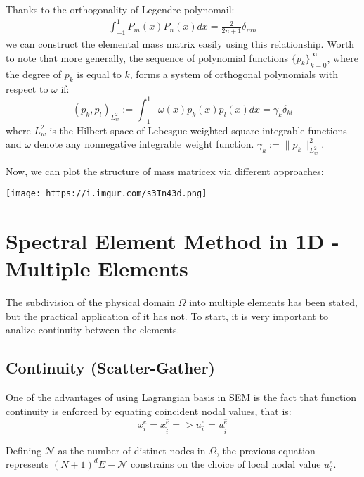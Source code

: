 \documentclass[
]{scrartcl}
\begin{document}
Thanks to the orthogonality of Legendre polynomail: \begin{align}
\int_{-1}^1 P_m(x)P_n(x) dx = \frac{2}{2n+1}\delta_{mn} 
\end{align} we can construct the elemental mass matrix easily using this
relationship. Worth to note that more generally, the sequence of
polynomial functions \({\{p_k\}}^{\infty}_{k=0}\), where the degree of
\(p_k\) is equal to \(k\), forms a system of orthogonal polynomials with
respect to \(\omega\) if: \begin{equation}
(p_k,p_l)_{L_w^2}:=\int_{-1}^1\omega(x)p_k(x)p_l(x)dx= \gamma_k\delta_{kl}
\end{equation} where \(L_w^2\) is the Hilbert space of
Lebesgue-weighted-square-integrable functions and \(\omega\) denote any
nonnegative integrable weight function. \(\gamma_k:=\|p_k\|^2_{L_w^2}\).

Now, we can plot the structure of mass matricex via different
approaches:

\texttt{[image: https://i.imgur.com/s3In43d.png]}

\hypertarget{spectral-element-method-in-1d---multiple-elements}{%
\section{Spectral Element Method in 1D - Multiple
Elements}\label{spectral-element-method-in-1d---multiple-elements}}

The subdivision of the physical domain \(\Omega\) into multiple elements
has been stated, but the practical application of it has not. To start,
it is very important to analize continuity between the elements.

\hypertarget{continuity-scatter-gather}{%
\subsection{Continuity
(Scatter-Gather)}\label{continuity-scatter-gather}}

One of the advantages of using Lagrangian basis in SEM is the fact that
function continuity is enforced by equating coincident nodal values,
that is: \begin{equation}
    x_{i}^{e}=x_{\hat{i}}^{\hat{e}} => u_{i}^{e}=u_{\hat{i}}^{\hat{e}}
\end{equation}

Defining \(\mathcal{N}\) as the number of distinct nodes in \(\Omega\),
the previous equation represents \((N+1)^{d}E-\mathcal{N}\) constrains
on the choice of local nodal value \(u_{i}^{e}\).
\end{document}
